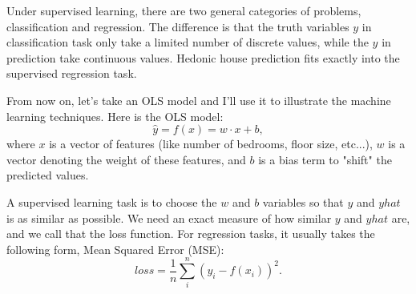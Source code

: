 \documentclass[a4paper]{article}
\begin{document}
Under supervised learning, there are two general categories of problems, classification and regression. The difference is that the truth variables $y$ in classification task only take a limited number of discrete values, while the $y$ in prediction take continuous values. Hedonic house prediction fits exactly into the supervised regression task.

From now on, let's take an OLS model and I'll use it to illustrate the machine learning techniques. Here is the OLS model:
\begin{equation}
\hat{y} = f(x) = w\cdot x + b,
\end{equation}
where $x$ is a vector of features (like number of bedrooms, floor size, etc...), $w$ is a vector denoting the weight of these features, and $b$ is a bias term to "shift" the predicted values.

A supervised learning task is to choose the $w$ and $b$ variables so that $y$ and $yhat$ is as similar as possible. We need an exact measure of how similar $y$ and $yhat$ are, and we call that the loss function. For regression tasks, it usually takes the following form, Mean Squared Error (MSE):
\begin{equation}
loss = \frac{1}{n}\sum_i^n \left( y_i - f(x_i) \right)^2.
\end{equation}
\end{document}
